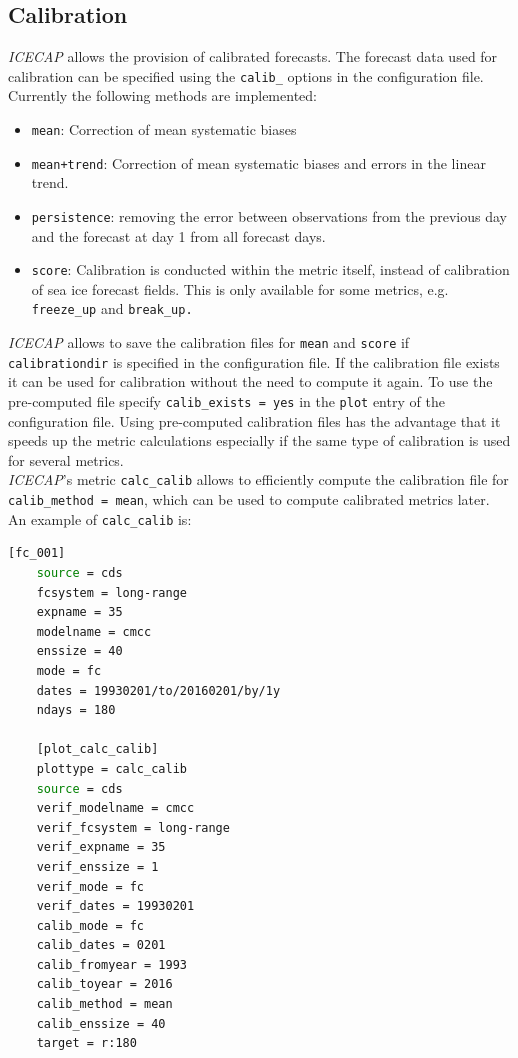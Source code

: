 \documentclass[DIV=10, parskip=full]{scrreprt}
\newcommand{\ice}{\textit{ICECAP}\xspace}
\begin{document}
\subsection{Calibration}
\label{subsec:calibration}
\ice allows the provision of calibrated forecasts. The forecast data used for calibration can be specified using the \texttt{calib\_} options in the configuration file. \\
Currently the following methods are implemented:
\begin{itemize}
	\item \texttt{mean}: Correction of mean systematic biases 
	\item \texttt{mean+trend}: Correction of mean systematic biases and errors in the linear trend.
	\item \texttt{persistence}: removing the error between observations from the previous day and the forecast at day 1 from all forecast days. 
	\item \texttt{score}: Calibration is conducted within the metric itself, instead of calibration of sea ice forecast fields. This is only available for some metrics, e.g. \texttt{freeze\_up} and \texttt{break\_up.}
\end{itemize}

\ice allows to save the calibration files for \texttt{mean} and \texttt{score} if \texttt{calibrationdir} is specified in the configuration file. If the calibration file exists it can be used for calibration without the need to compute it again. To use the pre-computed file specify \texttt{calib\_exists = yes} in the \texttt{plot} entry of the configuration file. Using pre-computed calibration files has the advantage that it speeds up the metric calculations especially if the same type of calibration is used for several metrics. \\


\ice's metric \texttt{calc\_calib} allows to efficiently compute the calibration file for \texttt{calib\_method = mean}, which can be used to compute calibrated metrics later. An example of \texttt{calc\_calib} is:

\begin{lstlisting}[language=bash]
	[fc_001]
	source = cds
	fcsystem = long-range
	expname = 35
	modelname = cmcc
	enssize = 40
	mode = fc
	dates = 19930201/to/20160201/by/1y
	ndays = 180

	[plot_calc_calib]
	plottype = calc_calib
	source = cds
	verif_modelname = cmcc
	verif_fcsystem = long-range
	verif_expname = 35
	verif_enssize = 1
	verif_mode = fc
	verif_dates = 19930201
	calib_mode = fc
	calib_dates = 0201
	calib_fromyear = 1993
	calib_toyear = 2016
	calib_method = mean
	calib_enssize = 40
	target = r:180
\end{lstlisting}
\end{document}
